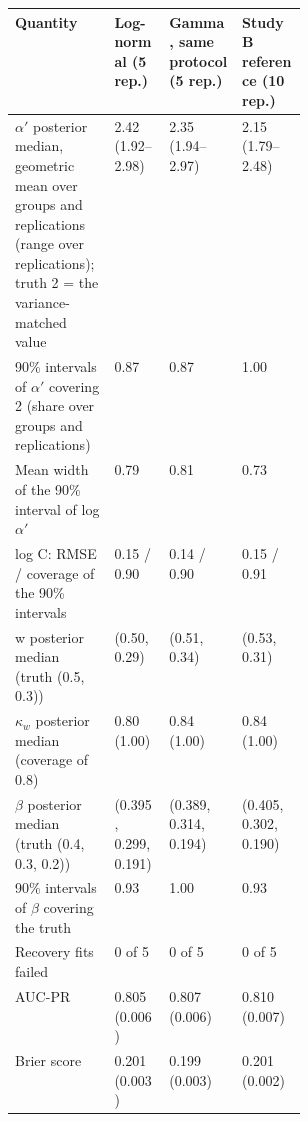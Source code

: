 \noindent\begin{minipage}{\linewidth}
\label{tab:S16}
\centering\scriptsize
\begin{tabular}{p{0.34\linewidth}lll}
\toprule
Quantity & Log-normal (5 rep.) & Gamma, same protocol (5 rep.) & Study B reference (10 rep.) \\ \midrule
$\alpha'$ posterior median, geometric mean over groups and replications (range over replications); truth 2 = the variance-matched value & 2.42 (1.92–2.98) & 2.35 (1.94–2.97) & 2.15 (1.79–2.48) \\
90\% intervals of $\alpha'$ covering 2 (share over groups and replications) & 0.87 & 0.87 & 1.00 \\
Mean width of the 90\% interval of log $\alpha'$ & 0.79 & 0.81 & 0.73 \\
log C: RMSE / coverage of the 90\% intervals & 0.15 / 0.90 & 0.14 / 0.90 & 0.15 / 0.91 \\
w posterior median (truth (0.5, 0.3)) & (0.50, 0.29) & (0.51, 0.34) & (0.53, 0.31) \\
$\kappa_w$ posterior median (coverage of 0.8) & 0.80 (1.00) & 0.84 (1.00) & 0.84 (1.00) \\
$\beta$ posterior median (truth (0.4, 0.3, 0.2)) & (0.395, 0.299, 0.191) & (0.389, 0.314, 0.194) & (0.405, 0.302, 0.190) \\
90\% intervals of $\beta$ covering the truth & 0.93 & 1.00 & 0.93 \\
Recovery fits failed & 0 of 5 & 0 of 5 & 0 of 5 \\
\midrule
AUC-PR & 0.805 (0.006) & 0.807 (0.006) & 0.810 (0.007) \\
Brier score & 0.201 (0.003) & 0.199 (0.003) & 0.201 (0.002) \\

\end{tabular}
\end{minipage}
